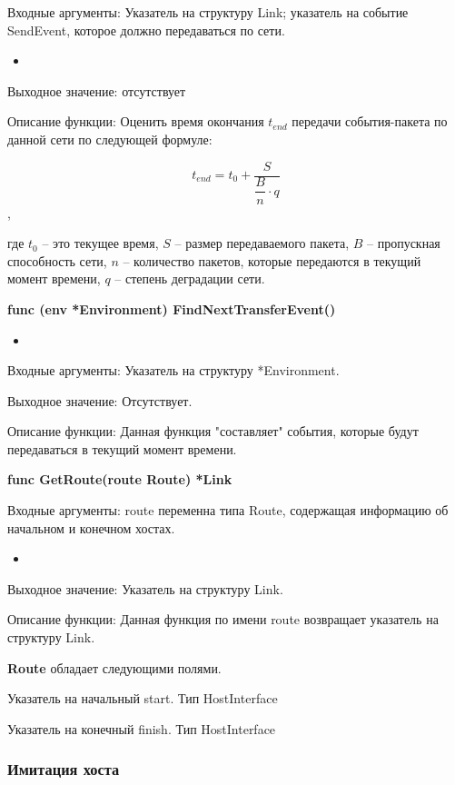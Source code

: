Входные аргументы: Указатель на структуру Link; указатель на событие SendEvent, которое должно передаваться по сети.
\begin{itemize}
	\item 
\end{itemize}
Выходное значение: отсутствует

Описание функции: Оценить время окончания  $t_{end}$ передачи события-пакета по данной сети по следующей формуле:

\[ t_{end} = t_0 + \dfrac{S}{\dfrac{B}{n}  \cdot q }  \], 

где $t_0$ -- это текущее время, \(S\) -- размер передаваемого пакета,  \(B\) -- пропускная способность сети, \(n\) -- количество пакетов, которые передаются в текущий момент времени,  \(q\) -- степень деградации сети. 


\textbf{func (env *Environment) FindNextTransferEvent()}
\begin{itemize}
	\item 
\end{itemize}
Входные аргументы: Указатель на структуру *Environment.

Выходное значение: Отсутствует. 

Описание функции: Данная функция "составляет" события, которые будут передаваться в текущий момент времени.  


\textbf{func GetRoute(route Route) *Link}

Входные аргументы: route переменна типа Route, содержащая информацию об начальном и конечном хостах.
\begin{itemize}
	\item 
\end{itemize}
Выходное значение: Указатель на структуру Link. 

Описание функции: Данная функция по имени route возвращает указатель на структуру Link.


\textbf{Route} обладает следующими полями.

Указатель на начальный	start. Тип  HostInterface

Указатель на конечный finish. Тип HostInterface

\subsubsection{Имитация хоста}

